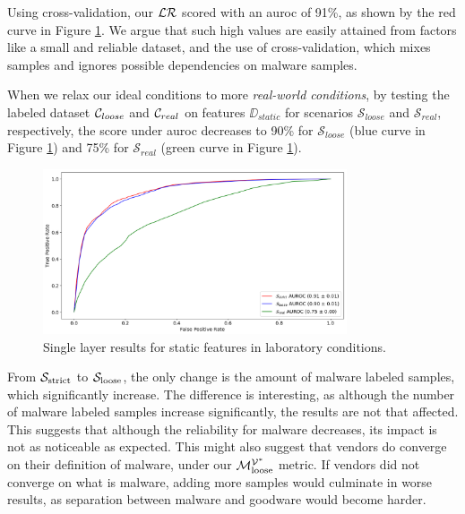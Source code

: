 Using cross-validation, our $\mathcal{LR}$ scored with an \gls{auroc} of 91\%, as shown by the red curve in Figure \ref{fig:xval_results}.
We argue that such high values are easily attained from factors like a small and reliable dataset, and the use of cross-validation, which mixes samples and ignores possible dependencies on malware samples.

When we relax our ideal conditions to more \textit{real-world conditions}, by testing the labeled dataset $\mathcal{C}_{loose}$ and $\mathcal{C}_{real}$ on features $\DD_{static}$ for scenarios $\mathcal{S}_{loose}$ and $\mathcal{S}_{real}$, respectively, the score under \gls{auroc} decreases to 90\% for $\mathcal{S}_{loose}$ (blue curve in Figure \ref{fig:xval_results}) and 75\% for $\mathcal{S}_{real}$ (green curve in Figure \ref{fig:xval_results}).

\begin{figure}[!htb]
	\centering
	\includegraphics[width=0.8\textwidth]{Figures/xval_results.png}
	\caption[Single layer results for static features in laboratory conditions.]{Single layer results for static features in laboratory conditions.}
	\label{fig:xval_results}
\end{figure}

From $\mathcal{S}_{\mathrm{strict}}$ to $\mathcal{S}_{\mathrm{loose}}$, the only change is the amount of malware labeled samples, which significantly increase.
The difference is interesting, as although the number of malware labeled samples increase significantly, the results are not that affected.
This suggests that although the reliability for malware decreases, its impact is not as noticeable as expected.
This might also suggest that vendors do converge on their definition of malware, under our $\mathcal{M}_{\mathrm{loose}}^{\mathcal{V}^*}$ metric.
If vendors did not converge on what is malware, adding more samples would culminate in worse results, as separation between malware and goodware would become harder.

